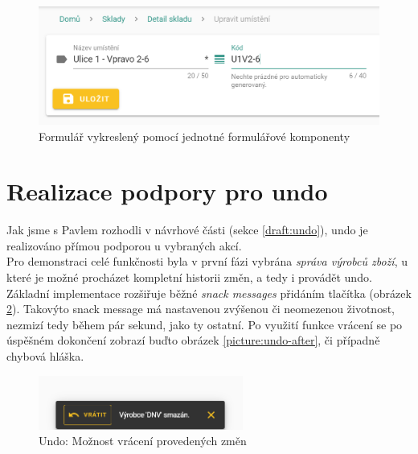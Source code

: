 \begin{figure}[]
\includegraphics[width=\textwidth]{../png/app/form_stock_location.png}
\caption{Formulář vykreslený pomocí jednotné formulářové komponenty} \label{picture:form-stock-location}
\end{figure}


\section{Realizace podpory pro undo}\label{implementation:undo}

Jak jsme s Pavlem rozhodli v návrhové části (sekce \ref{draft:undo}), undo je realizováno přímou podporou u vybraných akcí.\\
Pro demonstraci celé funkčnosti byla v první fázi vybrána \emph{správa výrobců zboží}, u které je možné procházet kompletní historii změn, a tedy i provádět undo. Základní implementace rozšiřuje běžné \emph{snack messages} přidáním tlačítka  (obrázek \ref{picture:undo}). Takovýto snack message má nastavenou zvýšenou či neomezenou životnost, nezmizí tedy během pár sekund, jako ty ostatní. Po využití funkce vrácení se po úspěšném dokončení zobrazí buďto obrázek \ref{picture:undo-after}, či případně chybová hláška.

\begin{figure}[h]
\includegraphics[width=0.6\textwidth]{../png/app/undo_snack.png}
\caption{Undo: Možnost vrácení provedených změn} \label{picture:undo}
\end{figure}

